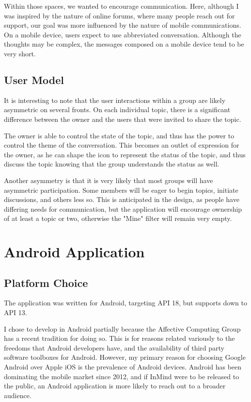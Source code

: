   Within those spaces, we wanted to encourage communication.
  Here, although I was inspired by the nature of online forums,
  where many people reach out for support,
  our goal was more influenced by the nature of mobile communications.
  On a mobile device, users expect to use abbreviated conversation.
  Although the thoughts may be complex, the messages composed on a mobile device
  tend to be very short.

    \subsection{User Model}
      It is interesting to note that the user interactions within a group
      are likely asymmetric on several fronts.
      On each individual topic, there is a significant difference between the owner
      and the users that were invited to share the topic.

      The owner is able to control the state of the topic,
      and thus has the power to control the theme of the conversation.
      This becomes an outlet of expression for the owner,
      as he can shape the icon to represent the status of the topic,
      and thus discuss the topic knowing that the group understands the status as well.

      Another asymmetry is that it is very likely that most groups will
      have asymmetric participation.
      Some members will be eager to begin topics, initiate discussions,
      and others less so.
      This is anticipated in the design,
      as people have differing needs for communication,
      but the application will encourage ownership of at least a topic or two,
      otherwise the "Mine" filter will remain very empty.

  \section{Android Application}

    \subsection{Platform Choice}
    The application was written for Android, targeting API 18,
    but supports down to API 13.

    I chose to develop in Android partially because the Affective Computing Group
    has a recent tradition for doing so.
    This is for reasons related variously to the freedoms that Android developers have,
    and the availability of third party software toolboxes for Android.
    However, my primary reason for choosing Google Android over Apple iOS is
    the prevalence of Android devices.
    Android has been dominating the mobile market since 2012,
    and if InMind were to be released to the public,
    an Android application is more likely to reach out to a broader audience.

